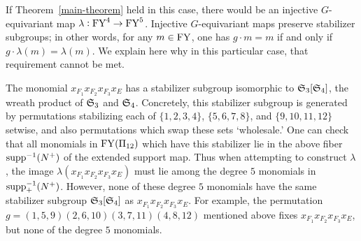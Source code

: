 \begin{remark}


If Theorem~\ref{main-theorem} held in this case, there would be an injective $G$-equivariant map $\lambda: \mathrm{FY}^4 \to \mathrm{FY}^5$. Injective $G$-equivariant maps preserve stabilizer subgroups; in other words, for any $m \in \mathrm{FY}$, one has $g \cdot m = m$ if and only if $g \cdot \lambda(m) = \lambda(m)$. We explain here why in this particular case, that requirement cannot be met.

The monomial $x_{F_1} x_{F_2} x_{F_3}x_E$ has a stabilizer subgroup isomorphic to $\mathfrak{S}_3[\mathfrak{S}_4]$, the wreath product of $\mathfrak{S}_3$ and $\mathfrak{S}_4$. Concretely, this stabilizer subgroup is generated by permutations stabilizing each of $\{1,2,3,4\}$, $\{5,6,7,8\}$, and $\{9,10,11,12\}$ setwise, and also permutations which swap these sets `wholesale.'  One can check that all monomials in $\mathrm{FY}(\Pi_{12})$ which have this stabilizer lie in the above fiber $\mathrm{supp}^{-1}(N^+)$
of the extended support map. Thus when attempting to construct $\lambda$, the image $\lambda(x_{F_1} x_{F_2} x_{F_3}x_E)$ must lie among the degree $5$ monomials in $\mathrm{supp}_+^{-1}(N^+)$. However, none of these degree $5$ monomials have the same stabilizer subgroup $\mathfrak{S}_3[\mathfrak{S}_4]$ as $x_{F_1} x_{F_2} x_{F_3}x_E$. For example, the permutation $g = (1,5,9)(2,6,10)(3,7,11)(4,8,12)$ mentioned above fixes
$x_{F_1} x_{F_2} x_{F_3}x_E$, but none of the degree $5$ monomials.
\end{remark}

